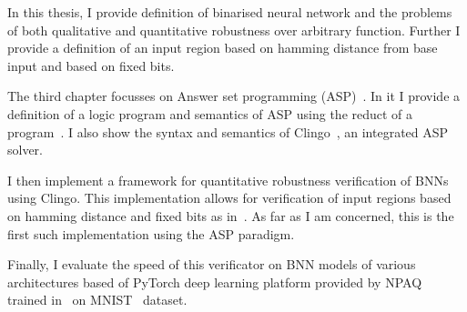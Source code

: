 In this thesis, I provide definition of binarised neural network and the problems
of both qualitative and quantitative robustness over arbitrary function.
Further I provide a definition of an input region based on hamming distance from
base input and based on fixed bits.

The third chapter focusses on Answer set programming (ASP)~\cite{lifschitz2008answer,anger2005glimpse}.
In it I provide a definition of a logic program and semantics of ASP using
the reduct of a program~\cite{gelfond1991}.
I also show the syntax and semantics of Clingo~\cite{gebser2019potassco},
an integrated ASP solver.

I then implement a framework for quantitative robustness verification of BNNs
using Clingo. This implementation allows for verification of input regions
based on hamming distance and fixed bits as in~\cite{zhang2021bdd4bnn}.
As far as I am concerned, this is the first such implementation using
the ASP paradigm.

Finally, I evaluate the speed of this verificator on BNN models of various
architectures based of PyTorch deep learning platform provided by NPAQ~\cite{baluta2019quantitative}
trained in~\cite{10.1145/3563212} on MNIST~\cite{mnist2017} dataset.
